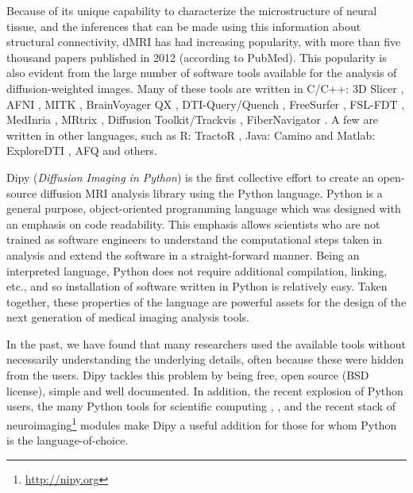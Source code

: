 \documentclass{bioinfo}
\begin{document}
Because of its unique capability to characterize the microstructure of neural
tissue, and the inferences that can be made using this information about
structural connectivity, dMRI has had increasing popularity, with more than five
thousand papers published in 2012 (according to PubMed). This popularity is
also evident from the large number of software tools available for the analysis
of diffusion-weighted images. Many of these tools are written in C/C++: 3D
Slicer \citep{pieper:06}, AFNI \citep{cox-afni:12}, MITK
\citep{fritzsche-mitk:12}, BrainVoyager QX \citep{goebel-brainvoyager:12},
DTI-Query/Quench \citep{sherbondy:05}, FreeSurfer \citep{fischl-freesurfer:12},
FSL-FDT \citep{smith-fdt:04}, MedInria \citep{toussaint-souplet-etal:07},
MRtrix \citep{Tournier2012}, Diffusion Toolkit/Trackvis
\citep{wang-diffusion-toolkit:07}, FiberNavigator \citep{vaillancourt:11,
  chamberland:13}. A few are written in other languages, such as R:
TractoR \citep{ clayden-TractoR:11}, Java: Camino \citep{Cook2006} and Matlab:
ExploreDTI \citep{leemans-exploredti:09}, AFQ \citep{yeatman2012afq} and
others.

Dipy (\textit{Diffusion Imaging in Python}) \citep{garyfallidis2011dipy} is
the first collective effort to create an open-source diffusion MRI analysis
library using the Python language. Python is a general purpose, object-oriented
programming language which was designed with an emphasis on code readability.
This emphasis allows scientists who are not trained as software engineers to
understand the computational steps taken in analysis and extend the software in a
straight-forward manner. Being an interpreted language, Python does not require
additional compilation, linking, etc., and so installation of software written
in Python is relatively easy. Taken together, these properties of the language
are powerful assets for the design of the next generation of medical imaging
analysis tools.


In the past, we have found that many researchers used the available
tools without necessarily understanding the underlying details, often because these
were hidden from the users. Dipy tackles this problem by being free, open
source (BSD license), simple and well documented. In addition, the recent
explosion of Python users, the many Python tools for scientific computing
\citep{perez_python:11}, \citep{mckinney_python:12}, \citep{perez_ipython:07}
and the recent stack of neuroimaging\footnote{\url{http://nipy.org}} modules
make Dipy a useful addition for those for whom Python is the
language-of-choice.
\end{document}
